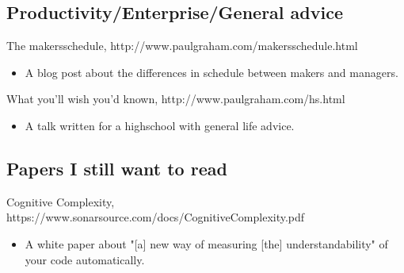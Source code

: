 \documentclass{article}
\begin{document}
\subsection{Productivity/Enterprise/General advice}
The makersschedule, http://www.paulgraham.com/makersschedule.html
\begin{itemize}
\item A blog post about the differences in schedule between makers and managers.
\end{itemize} 
What you'll wish you'd known, http://www.paulgraham.com/hs.html
\begin{itemize}
\item A talk written for a highschool with general life advice.
\end{itemize} 

\subsection{Papers I still want to read}
Cognitive Complexity, https://www.sonarsource.com/docs/CognitiveComplexity.pdf
\begin{itemize}
\item A white paper about "[a] new way of measuring [the] understandability" of your code automatically.
\end{itemize} 



\end{document}
